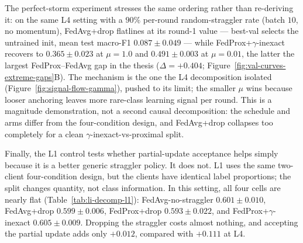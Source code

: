 \documentclass[11pt,a4paper]{report}
\begin{document}
The perfect-storm experiment stresses the same ordering rather than re-deriving
it: on the same L4 setting with a $90\%$ per-round random-straggler rate (batch
$10$, no momentum), FedAvg+drop flatlines at its round-1 value --- best-val
selects the untrained init, mean test macro-F1 $0.087 \pm 0.049$ --- while
FedProx+$\gamma$-inexact recovers to $0.365 \pm 0.023$ at $\mu = 1.0$ and
$0.491 \pm 0.003$ at $\mu = 0.01$, the latter the largest FedProx--FedAvg gap in
the thesis ($\Delta = +0.404$; Figure~\ref{fig:val-curves-extreme-gaps}B). The
mechanism is the one the L4 decomposition isolated (Figure~\ref{fig:signal-flow-gamma}),
pushed to its limit; the smaller $\mu$ wins because looser anchoring leaves more
rare-class learning signal per round. This is a magnitude demonstration, not a
second causal decomposition: the schedule and arms differ from the four-condition
design, and FedAvg+drop collapses too completely for a clean
$\gamma$-inexact-vs-proximal split.

Finally, the L1 control tests whether partial-update acceptance helps simply
because it is a better generic straggler policy. It does not. L1 uses the
same two-client four-condition design, but the clients have identical label
proportions; the split changes quantity, not class information. In this
setting, all four cells are nearly flat (Table~\ref{tab:li-decomp-l1}):
FedAvg-no-straggler $0.601 \pm 0.010$, FedAvg+drop $0.599 \pm 0.006$,
FedProx+drop $0.593 \pm 0.022$, and FedProx+$\gamma$-inexact
$0.605 \pm 0.009$. Dropping the straggler costs almost nothing, and accepting
the partial update adds only $+0.012$, compared with $+0.111$ at L4.
\end{document}
